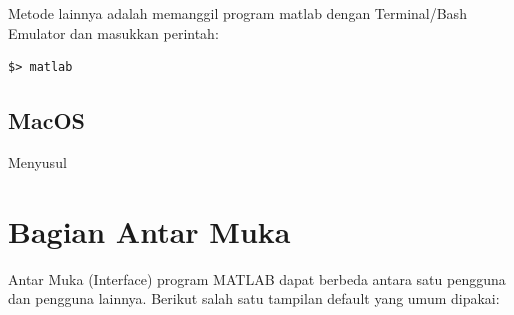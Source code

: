 \documentclass[12pt]{book}
\begin{document}
	\newpage
	Metode lainnya adalah memanggil program matlab dengan Terminal/Bash Emulator dan masukkan perintah:
	\begin{verbatim}
$> matlab
	\end{verbatim}

	\subsection{MacOS}

	Menyusul

	\newpage
	\section{Bagian Antar Muka}

	Antar Muka (Interface) program MATLAB dapat berbeda antara satu pengguna dan pengguna lainnya.
	Berikut salah satu tampilan default yang umum dipakai:
\end{document}

